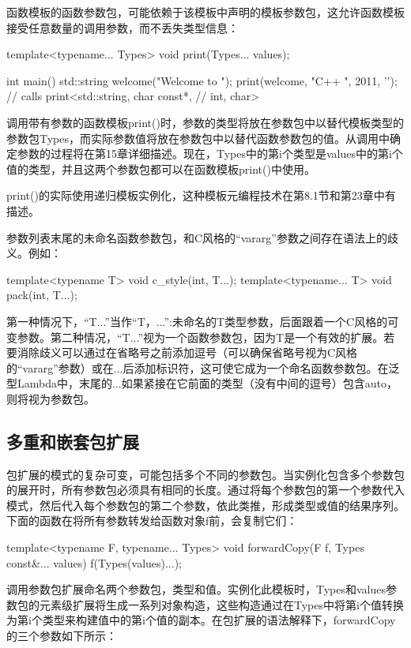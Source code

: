 函数模板的函数参数包，可能依赖于该模板中声明的模板参数包，这允许函数模板接受任意数量的调用参数，而不丢失类型信息：

\begin{cpp}
template<typename... Types>
void print(Types... values);

int main() {
	std::string welcome("Welcome to ");
	print(welcome, "C++ ", 2011, '\n'); // calls print<std::string, char const*,
} // int, char>
\end{cpp}

调用带有参数的函数模板print()时，参数的类型将放在参数包中以替代模板类型的参数包Types，而实际参数值将放在参数包中以替代函数参数包的值。从调用中确定参数的过程将在第15章详细描述。现在，Types中的第i个类型是values中的第i个值的类型，并且这两个参数包都可以在函数模板print()中使用。

print()的实际使用递归模板实例化，这种模板元编程技术在第8.1节和第23章中有描述。

参数列表末尾的未命名函数参数包，和C风格的“vararg”参数之间存在语法上的歧义。例如：

\begin{cpp}
template<typename T> void c_style(int, T...);
template<typename... T> void pack(int, T...);
\end{cpp}

第一种情况下，“T...”当作“T，...”:未命名的T类型参数，后面跟着一个C风格的可变参数。第二种情况，“T...”视为一个函数参数包，因为T是一个有效的扩展。若要消除歧义可以通过在省略号之前添加逗号（可以确保省略号视为C风格的“vararg”参数）或在...后添加标识符，这可使它成为一个命名函数参数包。在泛型Lambda中，末尾的...如果紧接在它前面的类型（没有中间的逗号）包含auto，则将视为参数包。

\subsection{多重和嵌套包扩展}

包扩展的模式的复杂可变，可能包括多个不同的参数包。当实例化包含多个参数包的展开时，所有参数包必须具有相同的长度。通过将每个参数包的第一个参数代入模式，然后代入每个参数包的第二个参数，依此类推，形成类型或值的结果序列。下面的函数在将所有参数转发给函数对象f前，会复制它们：

\begin{cpp}
template<typename F, typename... Types>
void forwardCopy(F f, Types const&... values) {
	f(Types(values)...);
}
\end{cpp}

调用参数包扩展命名两个参数包，类型和值。实例化此模板时，Types和values参数包的元素级扩展将生成一系列对象构造，这些构造通过在Types中将第i个值转换为第i个类型来构建值中的第i个值的副本。在包扩展的语法解释下，forwardCopy的三个参数如下所示：

